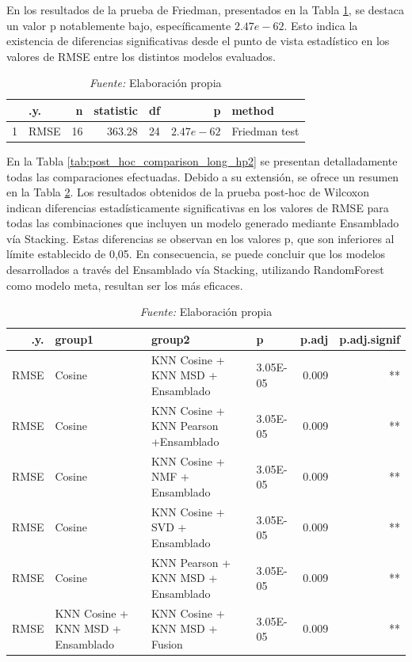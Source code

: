 En los resultados de la prueba de Friedman, presentados en la Tabla \ref{tab:friedman_test_results_hp2}, se destaca un valor p notablemente bajo, específicamente $2.47e-62$. Esto indica la existencia de diferencias significativas desde el punto de vista estadístico en los valores de RMSE entre los distintos modelos evaluados.

\begin{table}[H]
\caption{Resultados del test de Friedman a las técnicas de ensamblado}
\centering
\begin{tabular}{rlrrrrl}
  \hline
 & .y. & n & statistic & df & p & method \\ 
  \hline
1 & RMSE &  16 & 363.28 & 24 & $2.47e-62$ & Friedman test \\ 
   \hline
\end{tabular}
\label{tab:friedman_test_results_hp2}
\caption*{\small\textit{Fuente:} Elaboración propia}
\end{table}



En la Tabla \ref{tab:post_hoc_comparison_long_hp2} se presentan detalladamente todas las comparaciones efectuadas. Debido a su extensión, se ofrece un resumen en la Tabla \ref{tab:post_hoc_comparison_summary_hp2}. Los resultados obtenidos de la prueba post-hoc de Wilcoxon indican diferencias estadísticamente significativas en los valores de RMSE para todas las combinaciones que incluyen un modelo generado mediante Ensamblado vía Stacking. Estas diferencias se observan en los valores p, que son inferiores al límite establecido de 0,05. En consecuencia, se puede concluir que los modelos desarrollados a través del Ensamblado vía Stacking, utilizando RandomForest como modelo meta, resultan ser los más eficaces.

\begin{table}[H]
\caption{Resultados de la prueba post-hoc Wilcocox a los modelos de la segunda hipótesis}
\label{tab:post_hoc_comparison_summary_hp2}
    \centering
    \begin{tabular}{rp{4cm}p{4cm}lrr} 
     \hline
        .y. & group1 & group2 & p & p.adj & p.adj.signif \\ \hline
        RMSE & Cosine & KNN Cosine + KNN MSD + Ensamblado & 3.05E-05 & 0.009 & ** \\ \hline
        RMSE & Cosine & KNN Cosine + KNN Pearson +Ensamblado & 3.05E-05 & 0.009 & ** \\ \hline
        RMSE & Cosine & KNN Cosine + NMF + Ensamblado & 3.05E-05 & 0.009 & ** \\ \hline
        RMSE & Cosine & KNN Cosine + SVD + Ensamblado & 3.05E-05 & 0.009 & ** \\ \hline
        RMSE & Cosine & KNN Pearson + KNN MSD + Ensamblado  & 3.05E-05 & 0.009 & ** \\ \hline
        RMSE & KNN Cosine + KNN MSD + Ensamblado & KNN Cosine + KNN MSD + Fusion & 3.05E-05 & 0.009 & ** \\ \hline
    \end{tabular}
    \caption*{\small\textit{Fuente:} Elaboración propia}
\end{table}

